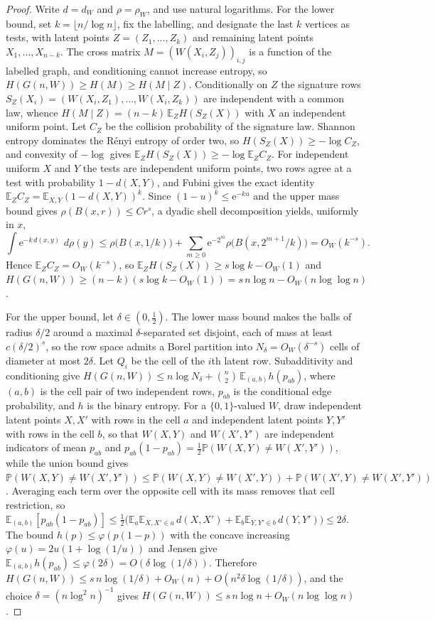 \documentclass[11pt]{article}
\theoremstyle{definition}
\newcommand{\e}{\mathrm{e}}
\newcommand{\E}{\mathbb E}
\newcommand{\Pp}{\mathbb P}
\newcommand{\dd}{\,d}
\providecommand{\E}{\mathbb E}
\providecommand{\Pp}{\mathbb P}
\begin{document}
\begin{proof}
Write $d=d_W$ and $\rho=\rho_W$, and use natural logarithms.  For the
lower bound, set $k=\lfloor n/\log n\rfloor$, fix the labelling, and
designate the last $k$ vertices as tests, with latent points
$Z=(Z_1,\ldots,Z_k)$ and remaining latent points $X_1,\ldots,X_{n-k}$.
The cross matrix $M=(W(X_i,Z_j))_{i,j}$ is a function of the labelled
graph, and conditioning cannot increase entropy, so
$H(G(n,W))\ge H(M)\ge H(M\mid Z)$.  Conditionally on $Z$ the signature
rows $S_Z(X_i)=(W(X_i,Z_1),\ldots,W(X_i,Z_k))$ are independent with a
common law, whence $H(M\mid Z)=(n-k)\,\E_Z H(S_Z(X))$ with $X$ an
independent uniform point.  Let $C_Z$ be the collision probability of
the signature law.  Shannon entropy dominates the R\'enyi entropy of
order two, so $H(S_Z(X))\ge-\log C_Z$, and convexity of $-\log$ gives
$\E_Z H(S_Z(X))\ge-\log\E_Z C_Z$.  For independent uniform $X$ and $Y$
the tests are independent uniform points, two rows agree at a test with
probability $1-d(X,Y)$, and Fubini gives the exact identity
$\E_Z C_Z=\E_{X,Y}(1-d(X,Y))^{k}$.  Since $(1-u)^k\le\e^{-ku}$ and the upper mass bound gives $\rho(B(x,r))\le Cr^s$, a dyadic shell
decomposition yields, uniformly in $x$,
\[
\int\e^{-k\,d(x,y)}\,\dd\rho(y)
\le\rho\bigl(B(x,1/k)\bigr)
+\sum_{m\ge0}\e^{-2^{m}}\rho\bigl(B(x,2^{m+1}/k)\bigr)
=O_W(k^{-s}).
\]
Hence $\E_Z C_Z=O_W(k^{-s})$, so
$\E_Z H(S_Z(X))\ge s\log k-O_W(1)$ and
$H(G(n,W))\ge(n-k)(s\log k-O_W(1))=s\,n\log n-O_W(n\log\log n)$.

For the upper bound, let $\delta\in(0,\tfrac12)$.  The lower mass bound
makes the balls of radius $\delta/2$ around a maximal
$\delta$-separated set disjoint, each of mass at least $c(\delta/2)^s$, so the row space admits a Borel partition into
$N_\delta=O_W(\delta^{-s})$ cells of diameter at most $2\delta$.  Let
$Q_i$ be the cell of the $i$th latent row.  Subadditivity and
conditioning give
$H(G(n,W))\le n\log N_\delta+\binom n2\,\E_{(a,b)}h(p_{ab})$, where
$(a,b)$ is the cell pair of two independent rows, $p_{ab}$ is the
conditional edge probability, and $h$ is the binary entropy.  For a $\{0,1\}$-valued $W$, draw independent latent points $X,X'$ with rows in the cell $a$ and independent latent points $Y,Y'$ with rows in the cell $b$, so that $W(X,Y)$ and $W(X',Y')$ are independent indicators of mean $p_{ab}$ and $p_{ab}(1-p_{ab})=\tfrac12\Pp(W(X,Y)\ne W(X',Y'))$, while the union bound gives $\Pp(W(X,Y)\ne W(X',Y'))\le\Pp(W(X,Y)\ne W(X',Y))+\Pp(W(X',Y)\ne W(X',Y'))$. Averaging each term over the opposite cell with its mass removes that cell restriction, so $\E_{(a,b)}[p_{ab}(1-p_{ab})]\le\tfrac12\bigl(\E_a\E_{X,X'\in a}\,d(X,X')+\E_b\E_{Y,Y'\in b}\,d(Y,Y')\bigr)\le2\delta$.
The bound $h(p)\le\varphi(p(1-p))$ with the concave increasing
$\varphi(u)=2u(1+\log(1/u))$ and Jensen give
$\E_{(a,b)}h(p_{ab})\le\varphi(2\delta)=O(\delta\log(1/\delta))$.
Therefore
$H(G(n,W))\le s\,n\log(1/\delta)+O_W(n)+O(n^2\delta\log(1/\delta))$,
and the choice $\delta=(n\log^2n)^{-1}$ gives
$H(G(n,W))\le s\,n\log n+O_W(n\log\log n)$.
\end{proof}
\end{document}
